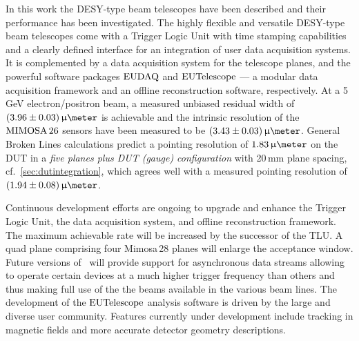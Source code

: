 

In this work the DESY-type beam telescopes have been described and their performance has been investigated. 
The highly flexible and versatile DESY-type beam telescopes come with a Trigger Logic Unit with time stamping capabilities and a clearly defined interface for an integration of user data acquisition systems.
It is complemented by a data acquisition system for the telescope planes, and the powerful software packages $\textrm{EUDAQ}$ and $\textrm{EUTelescope}$
 ---  a modular data acquisition framework and an offline reconstruction software, respectively. 
At a 5\,GeV electron/positron beam, a measured unbiased residual width of $(3.96 \pm 0.03)\,\upmu\meter$ is achievable
 and the intrinsic resolution of the $\textrm{MIMOSA\,26}$ sensors have been measured to be $(3.43 \pm 0.03)\,\upmu\meter$.
General Broken Lines calculations predict a pointing resolution of $1.83\,\upmu\meter$ on the DUT in a \textit{five planes plus DUT (gauge) configuration} with 20\,mm plane spacing, cf.~\ref{sec:dutintegration},
 which agrees well with a measured pointing resolution of $(1.94 \pm 0.08)\,\upmu\meter$.

Continuous development efforts are ongoing to upgrade and enhance the Trigger Logic Unit, the data acquisition system, and offline reconstruction framework.  
The maximum achievable rate will be increased by the successor of the TLU. 
A quad plane comprising four Mimosa\,28 planes will enlarge the acceptance window. 
Future versions of \eudaq\ will provide support for asynchronous data streams allowing to operate certain devices at a much higher trigger frequency than others
 and thus making full use of the the beams available in the various beam lines.
The development of the $\textrm{EUTelescope}$ analysis software is driven by the large and diverse user community. 
Features currently under development include tracking in magnetic fields and more accurate detector geometry descriptions. 

